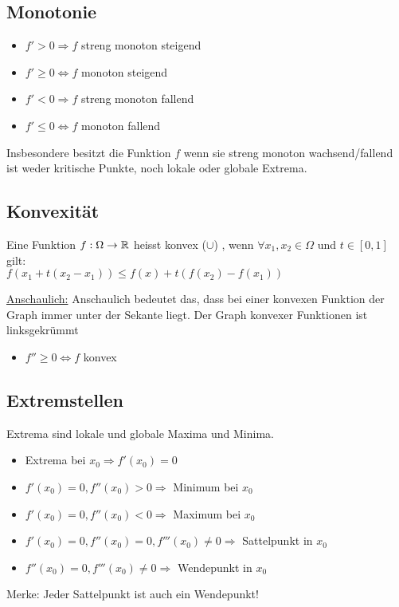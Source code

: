 \subsection{Monotonie}
\begin{itemize}
	\item $f' > 0 \Rightarrow f$ streng monoton steigend
	\item $f' \geq 0 \Leftrightarrow f$ monoton steigend
	\item $f' < 0 \Rightarrow f$ streng monoton fallend
	\item $f' \leq 0 \Leftrightarrow f$ monoton fallend
\end{itemize}
Insbesondere besitzt die Funktion $f$ wenn sie streng monoton wachsend/fallend ist
weder kritische Punkte, noch lokale oder globale Extrema.

\subsection{Konvexität}

\begin{definition}[konvex]
Eine Funktion $f: \Omega \to \mathbb{R}$ heisst konvex ($\cup$) , wenn $\forall x_1,x_2 \in \Omega$ und $t \in [0, 1]$ gilt:\\
$f(x_1 + t(x_2 - x_1)) \leq f(x) + t(f(x_2) - f(x_1))$
\end{definition}

\underline{Anschaulich:} Anschaulich bedeutet das, dass bei einer konvexen Funktion
der Graph immer unter der Sekante liegt. Der Graph konvexer Funktionen ist linksgekrümmt

\begin{itemize}
	\item $f'' \geq 0 \Leftrightarrow f$ konvex
\end{itemize}

\subsection{Extremstellen}
Extrema sind lokale und globale Maxima und Minima. 
\begin{itemize}
	\item Extrema bei $x_0 \Rightarrow f'(x_0) = 0$
	\item $f'(x_0) = 0, f''(x_0) > 0 \Rightarrow$ Minimum bei $x_0$
	\item $f'(x_0) = 0, f''(x_0) < 0 \Rightarrow$ Maximum bei $x_0$
	\item $f'(x_0) = 0, f''(x_0) = 0, f'''(x_0) \neq 0 \Rightarrow$ Sattelpunkt in $x_0$
	\item \hspace{1.6cm} $f''(x_0) = 0, f'''(x_0) \neq 0 \Rightarrow$ Wendepunkt in $x_0$
\end{itemize}
Merke: Jeder Sattelpunkt ist auch ein Wendepunkt!

